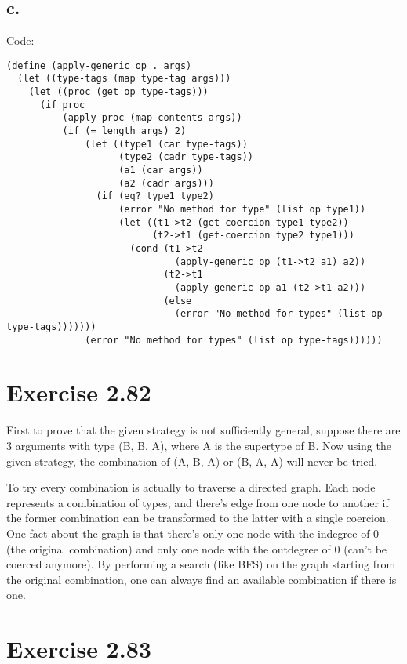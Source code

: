 \documentclass[../main.tex]{subfiles}
\begin{document}
\subsection{c.}

Code:

\begin{lstlisting}
(define (apply-generic op . args)
  (let ((type-tags (map type-tag args)))
    (let ((proc (get op type-tags)))
      (if proc
          (apply proc (map contents args))
          (if (= length args) 2)
              (let ((type1 (car type-tags))
                    (type2 (cadr type-tags))
                    (a1 (car args))
                    (a2 (cadr args)))
                (if (eq? type1 type2)
                    (error "No method for type" (list op type1))
                    (let ((t1->t2 (get-coercion type1 type2))
                          (t2->t1 (get-coercion type2 type1)))
                      (cond (t1->t2
                              (apply-generic op (t1->t2 a1) a2))
                            (t2->t1
                              (apply-generic op a1 (t2->t1 a2)))
                            (else
                              (error "No method for types" (list op type-tags)))))))
              (error "No method for types" (list op type-tags))))))
\end{lstlisting}

\section{Exercise 2.82}

First to prove that the given strategy is not sufficiently general, suppose
 there are 3 arguments with type (B, B, A), where A is the supertype
 of B. Now using the given strategy, the combination of (A, B, A) or (B, A, A)
 will never be tried.

To try every combination is actually to traverse a directed graph. Each node
 represents a combination of types, and there's edge from one node to another
 if the former combination can be transformed to the latter with a single
 coercion. One fact about the graph is that there's only one node with the
 indegree of 0 (the original combination) and only one node with the outdegree
 of 0 (can't be coerced anymore). By performing a search (like BFS) on the graph
 starting from the original combination, one can always find an available
 combination if there is one.

\section{Exercise 2.83}
\end{document}
